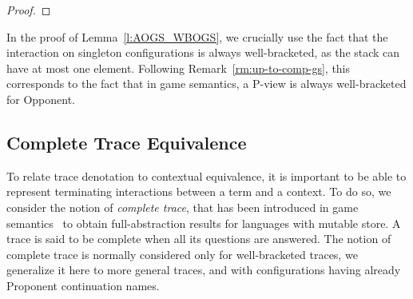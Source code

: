 \begin{proof}
\end{proof} 


\begin{remark}
In the proof of Lemma~\ref{l:AOGS_WBOGS}, we crucially use the fact that the
interaction on singleton configurations is always well-bracketed, as
the stack can have at most one element. Following Remark~\ref{rm:up-to-comp-gs}, this corresponds
to the fact that in game semantics, a P-view is always well-bracketed for Opponent. 
\end{remark}

\subsection{Complete Trace Equivalence}

To relate trace denotation to contextual equivalence, it is important to 
be able to represent terminating interactions between a term and a context.
To do so, 
we consider the notion of \emph{complete trace}, 
that has been introduced in game semantics~\cite{abramsky1997linearity} to  
obtain full-abstraction results for languages with mutable 
store. A trace is said to be complete when all its questions
are answered.
The notion of complete trace is normally considered only for well-bracketed traces,
we generalize it here to more general traces,
and with configurations having already Proponent continuation names.

